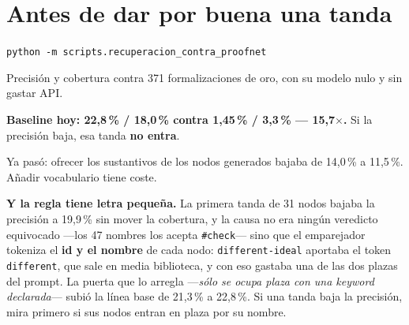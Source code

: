 \documentclass[10pt,a4paper]{article}
\begin{document}
\section*{Antes de dar por buena una tanda}

\begin{marca}
\noindent\texttt{python -m scripts.recuperacion\_contra\_proofnet}\par\smallskip
Precisión y cobertura contra 371 formalizaciones de oro, con su modelo nulo y
sin gastar API.\par\medskip
\textbf{Baseline hoy: 22,8\,\% / 18,0\,\% contra 1,45\,\% / 3,3\,\% —
15,7$\times$.} Si la precisión baja, esa tanda \textbf{no entra}.\par\medskip
Ya pasó: ofrecer los sustantivos de los nodos generados bajaba de 14,0\,\% a
11,5\,\%. Añadir vocabulario tiene coste.\par\medskip
\textbf{Y la regla tiene letra pequeña.} La primera tanda de 31 nodos bajaba
la precisión a 19,9\,\% sin mover la cobertura, y la causa no era ningún
veredicto equivocado —los 47 nombres los acepta \texttt{\#check}— sino que el
emparejador tokeniza el \textbf{id y el nombre} de cada nodo:
\texttt{different-\allowbreak{}ideal} aportaba el token \texttt{different},
que sale en media biblioteca, y con eso gastaba una de las dos plazas del
prompt. La puerta que lo arregla —\emph{sólo se ocupa plaza con una keyword
declarada}— subió la línea base de 21,3\,\% a 22,8\,\%. Si una tanda baja la
precisión, mira primero si sus nodos entran en plaza por su nombre.
\end{marca}
\end{document}
